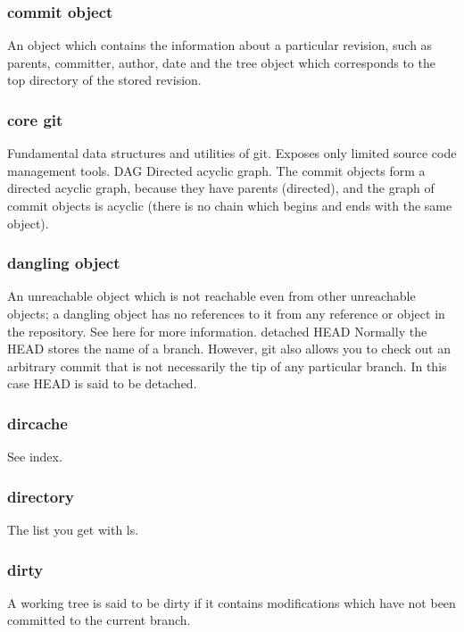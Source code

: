 \subsubsection{commit object}

An object which contains the information about a particular revision, such as parents, committer, author, date and the tree object which corresponds to the top directory of the stored revision.

\subsubsection{core git}

Fundamental data structures and utilities of git. Exposes only limited source code management tools.
DAG
Directed acyclic graph. The commit objects form a directed acyclic graph, because they have parents (directed), and the graph of commit objects is acyclic (there is no chain which begins and ends with the same object).

\subsubsection{dangling object}

An unreachable object which is not reachable even from other unreachable objects; a dangling object has no references to it from any reference or object in the repository. See here for more information.
detached HEAD
Normally the HEAD stores the name of a branch. However, git also allows you to check out an arbitrary commit that is not necessarily the tip of any particular branch. In this case HEAD is said to be detached.

\subsubsection{dircache}

See index.

\subsubsection{directory}

The list you get with ls.

\subsubsection{dirty}

A working tree is said to be dirty if it contains modifications which have not been committed to the current branch.

